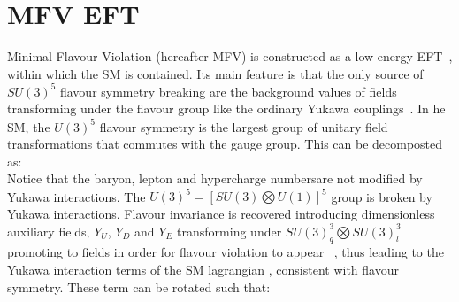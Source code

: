 \section{MFV EFT}
\label{sec:MFVEFT}
Minimal Flavour Violation (hereafter MFV) is constructed as a low-energy EFT~\cite{DAmbrosio:2002vsn}, within which the SM is contained. Its main feature is that the only source of $SU(3)^5$ flavour symmetry breaking are the background values of fields transforming under the flavour group like the ordinary Yukawa couplings~\cite{DAmbrosio:2002vsn}. 
In he SM, the $U(3)^5$ flavour symmetry is the largest group of unitary field transformations that commutes with the gauge group. This can be decomposted~\cite{DAmbrosio:2002vsn} as:
\begin{equation}
\end{equation}
Notice that the baryon, lepton and hypercharge numbersare not modified by Yukawa interactions. %
The $U(3)^5 = [SU(3) \bigotimes U(1)]^5$  group is broken by Yukawa interactions. Flavour invariance is recovered introducing dimensionless auxiliary fields, $Y_U$, $Y_D$ and $Y_E$ transforming under $SU(3)_q^3 \bigotimes SU(3)_l^3$ promoting to  fields in order for flavour violation to appear ~\cite{Altmannshofer:2007cs}, thus leading to the Yukawa interaction terms of the SM lagrangian , consistent with flavour symmetry. These term can be rotated such that: %

